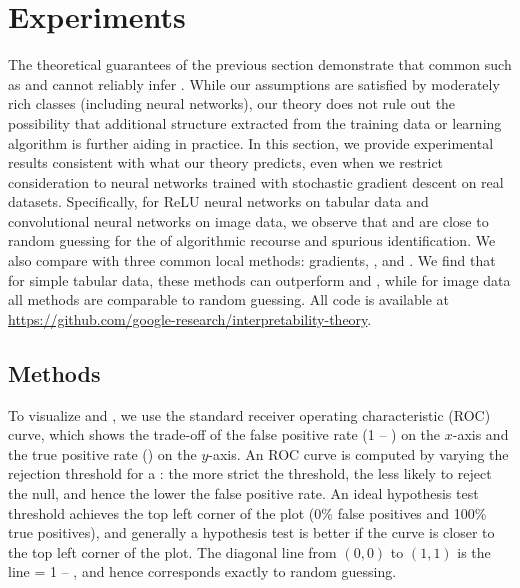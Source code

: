 %

\section{Experiments}\label{sec:experiments}

The theoretical guarantees of the previous section demonstrate that common \fielddefnames{} such as \shap{} and \intgradshort{} cannot reliably infer \countmodbehaviourname{}. 
While our assumptions are satisfied by moderately rich \modelname{} classes (including neural networks), 
%
our theory does not rule out the possibility that additional structure extracted from the training data or learning algorithm %
is further aiding \fielddefnames{} in practice.
In this section, we provide experimental results consistent with what our theory predicts, even when we restrict consideration to neural networks trained with stochastic gradient descent on real datasets.
%
%
Specifically, for ReLU neural networks on tabular data and convolutional neural networks on image data, we observe that \shap{} and \intgradshort{} are close to random guessing for the \downtasknames{} of algorithmic recourse and spurious \covname{} identification.
We also compare with three common local methods: gradients, \smoothgrad{}, and \lime{}. 
We find that for simple tabular data, these methods can outperform \shap{} and \intgradshort{}, while for image data all methods are comparable to random guessing.
%
All code is available at \url{https://github.com/google-research/interpretability-theory}.

\subsection{Methods}

To visualize \specname{} and \sensname{}, we use the standard receiver operating characteristic (ROC) curve, which shows the trade-off of the false positive rate (1 -- \specname{}) on the $x$-axis and the true positive rate (\sensname{}) on the $y$-axis. An ROC curve is computed by varying the rejection threshold for a \hyptestname{}: the more strict the threshold, the less likely to reject the null, and hence the lower the false positive rate. An ideal hypothesis test threshold achieves the top left corner of the plot (0\% false positives and 100\% true positives), and generally a hypothesis test is better if the curve is closer to the top left corner of the plot. The diagonal line from $(0,0)$ to $(1,1)$ is the line \specname{} = 1 -- \sensname{}, and hence corresponds exactly to random guessing.

